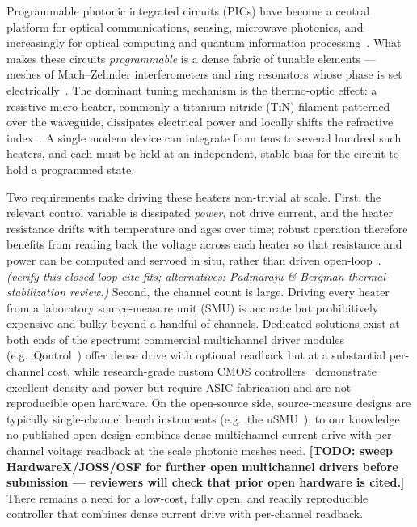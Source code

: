 \documentclass[11pt]{article}
\newif\ifdraft\drafttrue
\newcommand{\todo}[1]{\ifdraft{\color{red}\textbf{[TODO: #1]}}\fi}
\newcommand{\note}[1]{\ifdraft{\color{blue!60!black}\textit{(#1)}}\fi}
\begin{document}
Programmable photonic integrated circuits (PICs) have become a central platform
for optical communications, sensing, microwave photonics, and increasingly for
optical computing and quantum information
processing~\cite{bogaerts2020programmable}. What makes these circuits
\emph{programmable} is a dense fabric of tunable elements --- meshes of
Mach--Zehnder interferometers and ring resonators whose phase is set
electrically~\cite{bogaerts2020programmable,clements2016optimal}. The dominant
tuning mechanism is the thermo-optic effect: a resistive micro-heater, commonly
a titanium-nitride (TiN) filament patterned over the waveguide, dissipates
electrical power and locally shifts the refractive
index~\cite{harris2014efficient}. A single modern device can
integrate from tens to several hundred such heaters, and each must be held at an
independent, stable bias for the circuit to hold a programmed state.

Two requirements make driving these heaters non-trivial at scale. First, the
relevant control variable is dissipated \emph{power}, not drive current, and the
heater resistance drifts with temperature and ages over time; robust operation
therefore benefits from reading back the voltage across each heater so that
resistance and power can be computed and servoed in situ, rather than driven
open-loop~\cite{milanizadeh2019canceling}. \note{verify this closed-loop cite
fits; alternatives: Padmaraju \& Bergman thermal-stabilization review.} Second,
the channel count is large. Driving every heater from a laboratory
source-measure unit (SMU) is accurate but prohibitively expensive and bulky
beyond a handful of channels. Dedicated solutions exist at both ends of the
spectrum: commercial multichannel driver modules
(e.g.\ Qontrol~\cite{qontrol_q8a,qontrol_q8iv}) offer dense drive with optional
readback but at a substantial per-channel cost, while research-grade custom
CMOS controllers~\cite{sacchi2025controller} demonstrate excellent density and
power but require ASIC fabrication and are not reproducible open hardware. On
the open-source side, source-measure designs are typically single-channel
bench instruments (e.g.\ the uSMU~\cite{troughton_usmu}); to our knowledge no
published open design combines dense multichannel current drive with
per-channel voltage readback at the scale photonic meshes need. \todo{sweep
HardwareX/JOSS/OSF for further open multichannel drivers before submission ---
reviewers will check that prior open hardware is cited.} There remains a need
for a low-cost, fully open, and readily reproducible controller that combines
dense current drive with per-channel readback.
\end{document}
